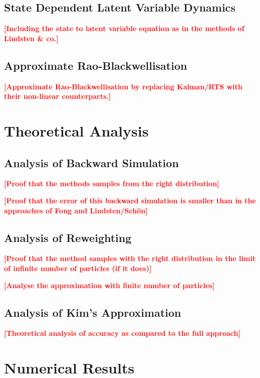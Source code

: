 \documentclass[twocolumn]{autart}    %
\newcommand{\comment}[1]{\textcolor{red}{\textbf{[#1]}}}
\begin{document}
\subsection{State Dependent Latent Variable Dynamics}

\comment{Including the state to latent variable equation as in the
  methods of Lindsten \& co.}

\subsection{Approximate Rao-Blackwellisation}

\comment{Approximate Rao-Blackwellisation by replacing Kalman/RTS
with their non-linear counterparts.}




\section{Theoretical Analysis}

\subsection{Analysis of Backward Simulation}

\comment{Proof that the methods samples from the right distribution}

\comment{Proof that the error of this backward simulation
is smaller than in the approaches of Fong and Lindsten/Sch\"on}

\subsection{Analysis of Reweighting}

\comment{Proof that the method samples with the right distribution
in the limit of infinite number of particles (if it does)}

\comment{Analyse the approximation with finite number of particles}

\subsection{Analysis of Kim's Approximation}

\comment{Theoretical analysis of accuracy as compared to the full
  approach}


\section{Numerical Results}
\end{document}
